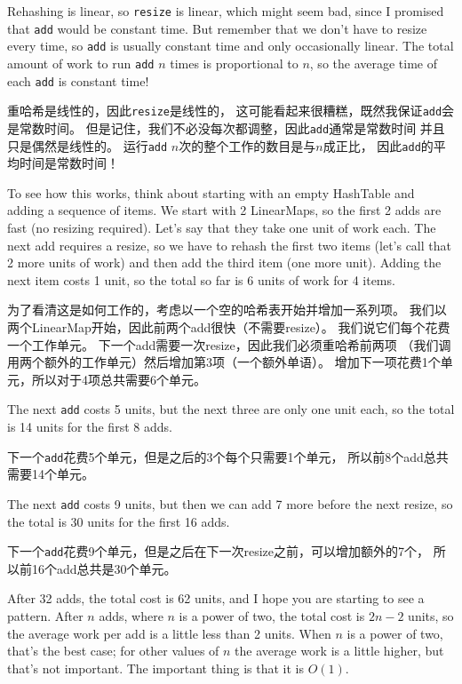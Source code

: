 \documentclass[10pt]{book}
\begin{document}
\begin{CJK}{UTF8}{gbsn}
Rehashing is linear, so
{\tt resize} is linear, which might seem bad, since I promised
that {\tt add} would be constant time.  But remember that
we don't have to resize every time, so {\tt add} is usually
constant time and only occasionally linear.  The total amount
of work to run {\tt add} $n$ times is proportional to $n$,
so the average time of each {\tt add} is constant time!

重哈希是线性的，因此{\tt resize}是线性的，
这可能看起来很糟糕，既然我保证{\tt add}会是常数时间。
但是记住，我们不必没每次都调整，因此{\tt add}通常是常数时间
并且只是偶然是线性的。
运行{\tt add} $n$次的整个工作的数目是与$n$成正比，
因此{\tt add}的平均时间是常数时间！

To see how this works, think about starting with an empty
HashTable and adding a sequence of items.  We start with 2 LinearMaps,
so the first 2 adds are fast (no resizing required).  Let's
say that they take one unit of work each.  The next add
requires a resize, so we have to rehash the first two
items (let's call that 2 more units of work) and then
add the third item (one more unit).  Adding the next item
costs 1 unit, so the total so far is
6 units of work for 4 items.

为了看清这是如何工作的，考虑以一个空的哈希表开始并增加一系列项。
我们以两个LinearMap开始，因此前两个add很快（不需要resize）。
我们说它们每个花费一个工作单元。
下一个add需要一次resize，因此我们必须重哈希前两项
（我们调用两个额外的工作单元）然后增加第3项（一个额外单语）。
增加下一项花费1个单元，所以对于4项总共需要6个单元。

The next {\tt add} costs 5 units, but the next three
are only one unit each, so the total is 14 units for the
first 8 adds.

下一个{\tt add}花费5个单元，但是之后的3个每个只需要1个单元，
所以前8个add总共需要14个单元。

The next {\tt add} costs 9 units, but then we can add 7 more
before the next resize, so the total is 30 units for the
first 16 adds.

下一个{\tt add}花费9个单元，但是之后在下一次resize之前，可以增加额外的7个，
所以前16个add总共是30个单元。

After 32 adds, the total cost is 62 units, and I hope you are starting
to see a pattern.  After $n$ adds, where $n$ is a power of two, the
total cost is $2n-2$ units, so the average work per add is
a little less than 2 units.  When $n$ is a power of two, that's
the best case; for other values of $n$ the average work is a little
higher, but that's not important.  The important thing is that it
is $O(1)$.


\end{CJK}
\end{document}

